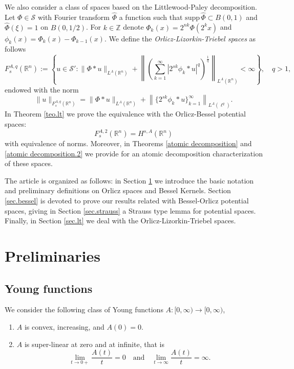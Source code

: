 \documentclass[leqno,twoside, 12pt]{amsart}
\theoremstyle{plain}
\numberwithin{equation}{section} \numberwithin{figure}{section}
\theoremstyle{definition}
\newcommand{\R}{\mathbb R}
\numberwithin{equation}{section}
\begin{document}
We also consider a class of spaces based on the Littlewood-Paley decomposition. Let  $\Phi \in \mathcal{S}$ with Fourier transform $\hat \Phi$  a function such that $\text{supp}\,\hat \Phi \subset B(0, 1)$ and $\hat \Phi(\xi)=1$ on $B(0, 1/2)$.
For $k\in \mathbb{Z}$ denote $\Phi_k (x)=2^{nk}\Phi(2^k x)$ and $\phi_k(x)=\Phi_k(x)-\Phi_{k-1}(x)$. We define the \emph{Orlicz-Lizorkin-Triebel spaces} as follows
$$
F_s^{A,q}(\R^n):=\left\{u\in \mathcal{S}'\colon \|\Phi*u\|_{L^A(\R^n)} + \left\| \left( \sum_{k=1}^\infty |2^{s k}\phi_k* u|^q\right)^\frac1q \right\|_{L^A(\R^n)}<\infty \right\}, \quad q>1,
$$
endowed with the norm
$$
\|u\|_{F_s^{A,q}(\R^n)}=\|\Phi*u\|_{L^A(\R^n)} + \left\|\{2^{s k}\phi_k*u\}_{k=1}^\infty \right\|_{L^A(\ell^q)}.
$$ 
In Theorem \ref{teo.lt} we prove the equivalence with the Orlicz-Bessel potential spaces:
$$
F_s^{A,2}(\R^n)=H^{s,A}(\R^n)
$$
with equivalence of norms. Moreover, in Theorems \ref{atomic decomposition} and \ref{atomic decomposition.2} we provide for an atomic decomposition characterization of these spaces.
 
The article is organized as follows: in Section \ref{sec.prelim} we introduce the basic notation and preliminary definitions on Orlicz spaces and Bessel Kernels. Section \ref{sec.bessel} is devoted to prove our results related with Bessel-Orlicz potential spaces, giving in Section \ref{sec.strauss} a Strauss type lemma for potential spaces. Finally, in Section \ref{sec.lt} we deal with the Orlicz-Lizorkin-Triebel spaces.


\section{Preliminaries} \label{sec.prelim}



\subsection{Young functions}

We consider the following class of Young functions $A:[0, \infty) \to [0, \infty)$,
\begin{enumerate}
\item[(i)] $A$ is convex, increasing, and $A(0) = 0$.
\item[(ii)] $A$ is super-linear at zero and at infinite, that is 
$$
\lim_{t\rightarrow 0+} \frac{A(t)}{t}=0\quad \text{and}\quad \lim_{t\rightarrow \infty} \frac{A(t)}{t}=\infty.
$$
\end{enumerate}
\end{document}
